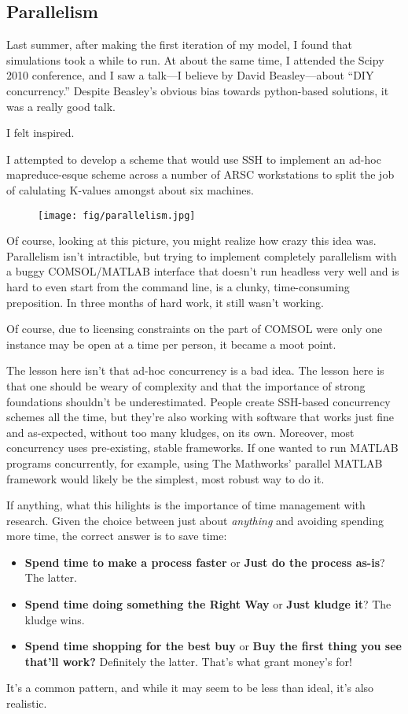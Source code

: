 \subsection{Parallelism}

Last summer, after making the first iteration of my model, I found that
simulations took a while to run. At about the same time, I attended the
Scipy 2010 conference, and I saw a talk---I believe by David
Beasley---about ``DIY concurrency.'' Despite Beasley's obvious bias
towards python-based solutions, it was a really good talk.

I felt inspired.

I attempted to develop a scheme that would use SSH to implement an
ad-hoc mapreduce-esque scheme across a number of ARSC workstations to
split the job of calulating K-values amongst about six machines.

\begin{figure}[H]
\centering
\texttt{[image: fig/parallelism.jpg]}
\caption{}
\end{figure}

Of course, looking at this picture, you might realize how crazy this
idea was. Parallelism isn't intractible, but trying to implement
completely parallelism with a buggy COMSOL/MATLAB interface that doesn't
run headless very well and is hard to even start from the command line,
is a clunky, time-consuming preposition. In three months of hard work,
it still wasn't working.

Of course, due to licensing constraints on the part of COMSOL were only
one instance may be open at a time per person, it became a moot point.

The lesson here isn't that ad-hoc concurrency is a bad idea. The lesson
here is that one should be weary of complexity and that the importance
of strong foundations shouldn't be underestimated. People create
SSH-based concurrency schemes all the time, but they're also working
with software that works just fine and as-expected, without too many
kludges, on its own. Moreover, most concurrency uses pre-existing,
stable frameworks. If one wanted to run MATLAB programs concurrently,
for example, using The Mathworks' parallel MATLAB framework would likely
be the simplest, most robust way to do it.

If anything, what this hilights is the importance of time management
with research. Given the choice between just about \emph{anything} and
avoiding spending more time, the correct answer is to save time:

\begin{itemize}
\item
  \textbf{Spend time to make a process faster} or \textbf{Just do the
  process as-is}? The latter.
\item
  \textbf{Spend time doing something the Right Way} or \textbf{Just
  kludge it}? The kludge wins.
\item
  \textbf{Spend time shopping for the best buy} or \textbf{Buy the first
  thing you see that'll work?} Definitely the latter. That's what grant
  money's for!
\end{itemize}
It's a common pattern, and while it may seem to be less than ideal, it's
also realistic.

